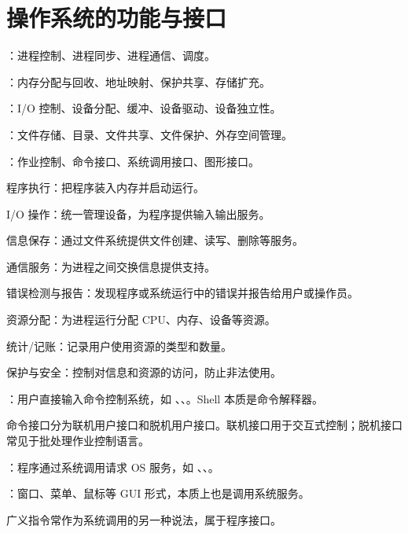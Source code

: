 \section{操作系统的功能与接口}
\begin{points}
  \item {}：进程控制、进程同步、进程通信、调度。
  \item {}：内存分配与回收、地址映射、保护共享、存储扩充。
  \item {}：I/O 控制、设备分配、缓冲、设备驱动、设备独立性。
  \item {}：文件存储、目录、文件共享、文件保护、外存空间管理。
  \item {}：作业控制、命令接口、系统调用接口、图形接口。
\end{points}


\begin{points}
  \item 程序执行：把程序装入内存并启动运行。
  \item I/O 操作：统一管理设备，为程序提供输入输出服务。
  \item 信息保存：通过文件系统提供文件创建、读写、删除等服务。
  \item 通信服务：为进程之间交换信息提供支持。
  \item 错误检测与报告：发现程序或系统运行中的错误并报告给用户或操作员。
  \item 资源分配：为进程运行分配 CPU、内存、设备等资源。
  \item 统计/记账：记录用户使用资源的类型和数量。
  \item 保护与安全：控制对信息和资源的访问，防止非法使用。
\end{points}


\begin{points}
  \item {}：用户直接输入命令控制系统，如 、、。Shell 本质是命令解释器。
  \item 命令接口分为联机用户接口和脱机用户接口。联机接口用于交互式控制；脱机接口常见于批处理作业控制语言。
  \item {}：程序通过系统调用请求 OS 服务，如 、、。
  \item {}：窗口、菜单、鼠标等 GUI 形式，本质上也是调用系统服务。
  \item 广义指令常作为系统调用的另一种说法，属于程序接口。
\end{points}


